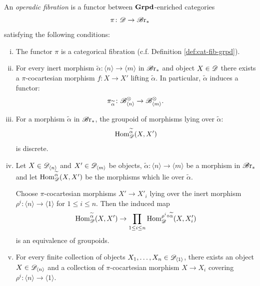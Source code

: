 \begin{defin}\label{def:operadicfib}
    An {\em operadic fibration} is a functor between $\operatorname{\textbf{Grpd}}$-enriched categories
    \[
        \pi \colon \mathscr{D} \to \mathscr{B} \text{r}_{\ast}
    \]
    satisfying the following conditions:
    \begin{enumerate}[(i)]
    \item The functor $\pi$ is a categorical fibration (c.f. Definition
    \ref{def:cat-fib-grpd}).
    \item For every inert morphism $\widetilde{\alpha} \colon \langle n \rangle
    \to \langle m \rangle$ in $\mathscr{B} \text{r}_{\ast}$ and object $X \in \mathscr{D}$ there exists a
    $\pi$-cocartesian morphism $f \colon X \to X'$ lifting $\widetilde{\alpha}$. In
    particular, $\widetilde{\alpha}$ induces a functor: $$\pi_{\widetilde{\alpha}} \colon
    \mathscr{B}^{\otimes}_{\langle n \rangle} \to \mathscr{B}^{\otimes}_{\langle m \rangle}.$$
    \item For a morphism $\widetilde{\alpha}$ in $\mathscr{B} \text{r}_{\ast}$, the groupoid of
    morphisms lying over $\widetilde{\alpha}$:
    $$\operatorname{Hom}_{\mathscr{D}}^{\widetilde{\alpha}}(X, X')$$ is discrete.
    \item Let $X \in \mathscr{D}_{\langle n \rangle}$ and $X' \in \mathscr{D}_{\langle m \rangle}$
    be objects, $\widetilde{\alpha}  : \langle n \rangle \to \langle m \rangle$
    be a morphism in $\mathscr{B} \text{r}_{\ast}$ and let $\operatorname{Hom}_{\mathscr{D}}^{\widetilde{\alpha}}(X, X')$ be the 
    morphisms which lie over $\widetilde{\alpha}$. 
    
    Choose $\pi$-cocartesian morphisms $X' \to X'_i$ lying over the inert
    morphism $\rho^i \colon \langle n \rangle \to \langle 1 \rangle$ for $1 \leq
    i \leq n$. Then the induced map
    \[
        \operatorname{Hom}_{\mathscr{D}}^{\widetilde{\alpha}}(X, X') \to \prod_{1 \leq i \leq n} \operatorname{Hom}_{\mathscr{D}}^{\rho^i \circ \widetilde{\alpha}}(X, X_i')
    \]
    is an equivalence of groupoids. 
    
    \item For every finite collection of objects $X_1, \dots, X_n \in
    \mathscr{D}_{\langle 1 \rangle}$, there exists an object $X \in \mathscr{D}_{\langle n
    \rangle}$ and a collection of $\pi$-cocartesian morphism $X \to X_i$
    covering $\rho^i \colon \langle n \rangle \to \langle 1 \rangle$.
    \end{enumerate}
\end{defin}





